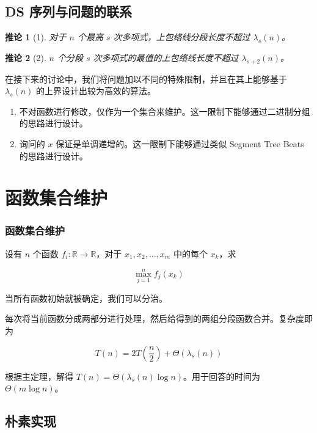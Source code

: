 \documentclass[mathserif]{ctexbeamer}
\newtheorem{Col}{推论}
\begin{document}
\subsection{DS 序列与问题的联系}

\frame
{
  \begin{Col}[1]
  对于 $n$ 个最高 $s$ 次多项式，上包络线分段长度不超过 $\lambda_s(n)$。 
  \end{Col}
  
  \begin{Col}[2]
  $n$ 个分段 $s$ 次多项式的最值的上包络线长度不超过 $\lambda_{s+2}(n)$。
  \end{Col}
  
  
在接下来的讨论中，我们将问题加以不同的特殊限制，并且在其上能够基于 $\lambda_s(n)$ 的上界设计出较为高效的算法。

\begin{enumerate}
\item 不对函数进行修改，仅作为一个集合来维护。这一限制下能够通过二进制分组的思路进行设计。
\item 询问的 $x$ 保证是单调递增的。这一限制下能够通过类似 Segment Tree Beats 的思路进行设计。
\end{enumerate}

}


\section{函数集合维护}

\frame
{
\frametitle{函数集合维护}

设有 $n$ 个函数 $f_i : \mathbb R \rightarrow \mathbb R$，对于 $x_1, x_2, \dots, x_m$ 中的每个 $x_k$，求

$$
\max_{j=1}^n f_j(x_k)
$$

当所有函数初始就被确定，我们可以分治。

}

\frame
{
每次将当前函数分成两部分进行处理，然后给得到的两组分段函数合并。复杂度即为

$$
T(n) = 2T \left(\frac n2\right) + \Theta(\lambda_s (n))
$$

根据主定理，解得 $T(n) = \Theta(\lambda_s(n) \log n)$。用于回答的时间为 $\Theta(m\log n)$。
}

\subsection{朴素实现}
\end{document}
